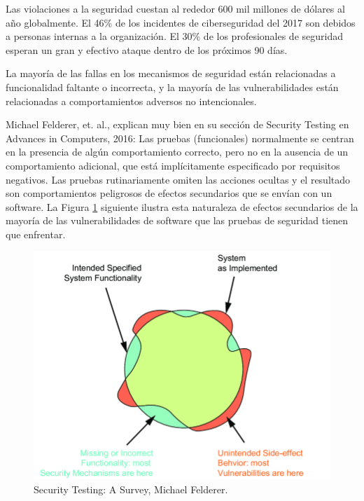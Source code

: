 Las violaciones a la seguridad cuestan al rededor 600 mil millones de dólares al año globalmente\cite{mcafeecsis}. El 46\% de los incidentes de ciberseguridad del 2017 son debidos a personas internas a la organización\cite{kasperskyHumanFactor}. El 30\% de los profesionales de seguridad esperan un gran y efectivo ataque dentro de los próximos 90 días.\cite{theeconomistCyberChasm}

La mayoría de las fallas en los mecanismos de seguridad están relacionadas a funcionalidad faltante o incorrecta, y la mayoría de las vulnerabilidades están relacionadas a comportamientos adversos no intencionales. 

Michael Felderer, et. al., explican muy bien en su sección de Security Testing\cite{FELDERER20161} en Advances in Computers, 2016:
Las pruebas (funcionales) normalmente se centran en la presencia de algún comportamiento correcto, pero no en la ausencia de un comportamiento adicional, que está implícitamente especificado por requisitos negativos. Las pruebas rutinariamente omiten las acciones ocultas y el resultado son comportamientos peligrosos de efectos secundarios que se envían con un software. La Figura \ref{fig:functionality side-effects} siguiente ilustra esta naturaleza de efectos secundarios de la mayoría de las vulnerabilidades de software que las pruebas de seguridad tienen que enfrentar\cite{FELDERER20161}.

\begin{figure}[h]
    \centering
    \includegraphics[scale=0.5]{images/functionality.png}
    \caption{Security Testing: A Survey, Michael Felderer.}
    \label{fig:functionality side-effects}
\end{figure}

